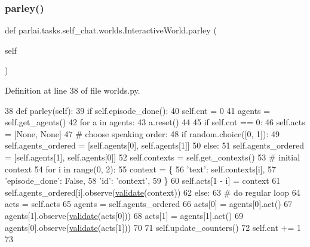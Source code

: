 \subsubsection{\texorpdfstring{parley()}{parley()}}
{\footnotesize\ttfamily def parlai.\+tasks.\+self\+\_\+chat.\+worlds.\+Interactive\+World.\+parley (\begin{DoxyParamCaption}\item[{}]{self }\end{DoxyParamCaption})}



Definition at line 38 of file worlds.\+py.


\begin{DoxyCode}
38     \textcolor{keyword}{def }parley(self):
39         \textcolor{keywordflow}{if} self.episode\_done():
40             self.cnt = 0
41             agents = self.get\_agents()
42             \textcolor{keywordflow}{for} a \textcolor{keywordflow}{in} agents:
43                 a.reset()
44 
45         \textcolor{keywordflow}{if} self.cnt == 0:
46             self.acts = [\textcolor{keywordtype}{None}, \textcolor{keywordtype}{None}]
47             \textcolor{comment}{# choose speaking order:}
48             \textcolor{keywordflow}{if} random.choice([0, 1]):
49                 self.agents\_ordered = [self.agents[0], self.agents[1]]
50             \textcolor{keywordflow}{else}:
51                 self.agents\_ordered = [self.agents[1], self.agents[0]]
52             self.contexts = self.get\_contexts()
53             \textcolor{comment}{# initial context}
54             \textcolor{keywordflow}{for} i \textcolor{keywordflow}{in} range(0, 2):
55                 context = \{
56                     \textcolor{stringliteral}{'text'}: self.contexts[i],
57                     \textcolor{stringliteral}{'episode\_done'}: \textcolor{keyword}{False},
58                     \textcolor{stringliteral}{'id'}: \textcolor{stringliteral}{'context'},
59                 \}
60                 self.acts[1 - i] = context
61                 self.agents\_ordered[i].observe(\hyperlink{namespaceparlai_1_1core_1_1worlds_afc3fad603b7bce41dbdc9cdc04a9c794}{validate}(context))
62         \textcolor{keywordflow}{else}:
63             \textcolor{comment}{# do regular loop}
64             acts = self.acts
65             agents = self.agents\_ordered
66             acts[0] = agents[0].act()
67             agents[1].observe(\hyperlink{namespaceparlai_1_1core_1_1worlds_afc3fad603b7bce41dbdc9cdc04a9c794}{validate}(acts[0]))
68             acts[1] = agents[1].act()
69             agents[0].observe(\hyperlink{namespaceparlai_1_1core_1_1worlds_afc3fad603b7bce41dbdc9cdc04a9c794}{validate}(acts[1]))
70 
71         self.update\_counters()
72         self.cnt += 1
73 \end{DoxyCode}



